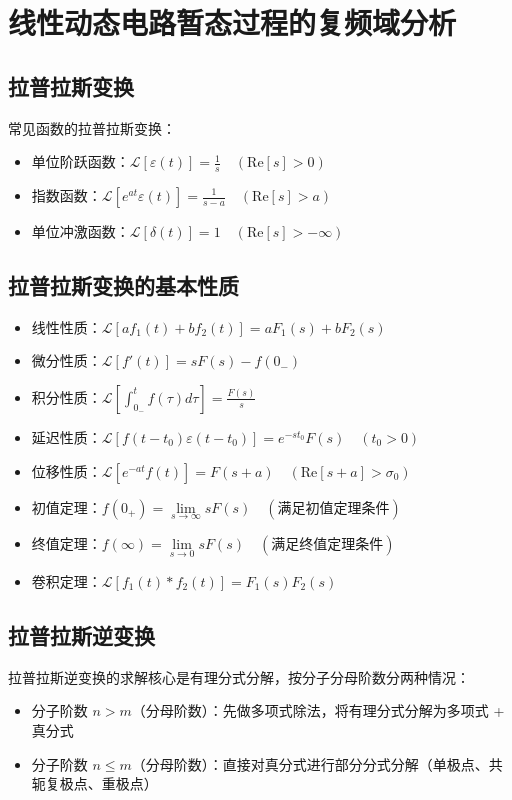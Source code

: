 \chapter{线性动态电路暂态过程的复频域分析}

\section{拉普拉斯变换}
常见函数的拉普拉斯变换：
\begin{itemize}
    \item 单位阶跃函数：$\mathcal{L}[\varepsilon(t)] = \frac{1}{s} \quad (\text{Re}[s] > 0)$
    \item 指数函数：$\mathcal{L}[e^{at}\varepsilon(t)] = \frac{1}{s-a} \quad (\text{Re}[s] > a)$
    \item 单位冲激函数：$\mathcal{L}[\delta(t)] = 1 \quad (\text{Re}[s] > -\infty)$
\end{itemize}

\section{拉普拉斯变换的基本性质}
\begin{itemize}
    \item 线性性质：$\mathcal{L}[a f_1(t) + b f_2(t)] = a F_1(s) + b F_2(s)$
    \item 微分性质：$\mathcal{L}[f'(t)] = sF(s) - f(0_-)$
    \item 积分性质：$\mathcal{L}\left[\int_{0_-}^t f(\tau)d\tau\right] = \frac{F(s)}{s}$
    \item 延迟性质：$\mathcal{L}[f(t-t_0)\varepsilon(t-t_0)] = e^{-st_0}F(s) \quad (t_0 > 0)$
    \item 位移性质：$\mathcal{L}[e^{-at}f(t)] = F(s+a) \quad (\text{Re}[s+a] > \sigma_0)$
    \item 初值定理：$f(0_+) = \lim\limits_{s \to \infty} sF(s) \quad (\text{满足初值定理条件})$
    \item 终值定理：$f(\infty) = \lim\limits_{s \to 0} sF(s) \quad (\text{满足终值定理条件})$
    \item 卷积定理：$\mathcal{L}[f_1(t) * f_2(t)] = F_1(s)F_2(s)$
\end{itemize}

\section{拉普拉斯逆变换}
拉普拉斯逆变换的求解核心是有理分式分解，按分子分母阶数分两种情况：
\begin{itemize}
    \item 分子阶数 $n > m$（分母阶数）：先做多项式除法，将有理分式分解为多项式 + 真分式
    \item 分子阶数 $n \leq m$（分母阶数）：直接对真分式进行部分分式分解（单极点、共轭复极点、重极点）
\end{itemize}


